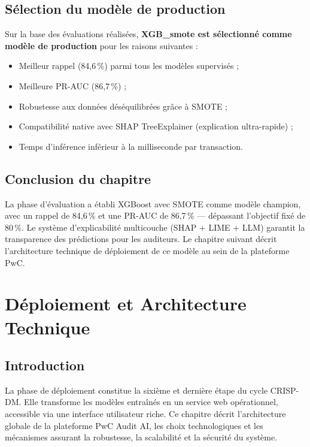 \documentclass[12pt,a4paper,twoside]{report}
\theoremstyle{definition}
\begin{document}
\section{Sélection du modèle de production}

Sur la base des évaluations réalisées, \textbf{XGB\_smote est sélectionné comme
modèle de production} pour les raisons suivantes :
\begin{itemize}
  \item Meilleur rappel (84,6\,\%) parmi tous les modèles supervisés ;
  \item Meilleure PR-AUC (86,7\,\%) ;
  \item Robustesse aux données déséquilibrées grâce à SMOTE ;
  \item Compatibilité native avec SHAP TreeExplainer (explication ultra-rapide) ;
  \item Temps d'inférence inférieur à la milliseconde par transaction.
\end{itemize}

\section{Conclusion du chapitre}

La phase d'évaluation a établi XGBoost avec SMOTE comme modèle champion, avec un
rappel de 84,6\,\% et une PR-AUC de 86,7\,\% — dépassant l'objectif fixé de 80\,\%.
Le système d'explicabilité multicouche (SHAP + LIME + LLM) garantit la transparence
des prédictions pour les auditeurs. Le chapitre suivant décrit l'architecture
technique de déploiement de ce modèle au sein de la plateforme PwC.

\chapter{Déploiement et Architecture Technique}

\section{Introduction}

La phase de déploiement constitue la sixième et dernière étape du cycle CRISP-DM.
Elle transforme les modèles entraînés en un service web opérationnel, accessible
via une interface utilisateur riche. Ce chapitre décrit l'architecture globale
de la plateforme PwC Audit AI, les choix technologiques et les mécanismes
assurant la robustesse, la scalabilité et la sécurité du système.
\end{document}
